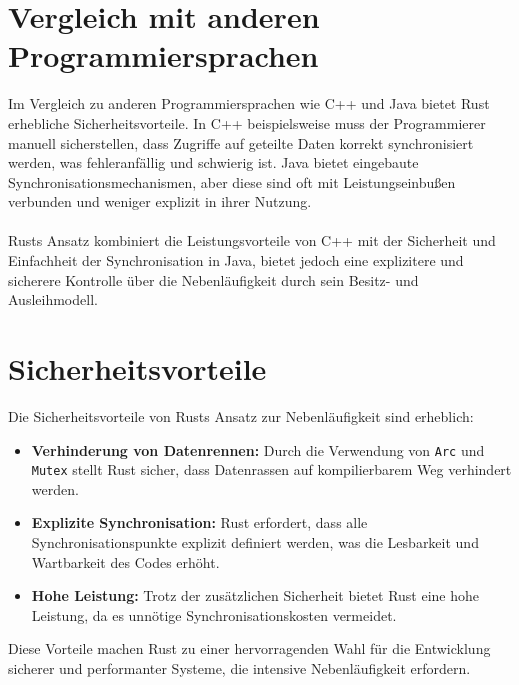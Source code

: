 \section{Vergleich mit anderen Programmiersprachen}

Im Vergleich zu anderen Programmiersprachen wie C++ und Java bietet Rust erhebliche Sicherheitsvorteile. 
In C++ beispielsweise muss der Programmierer manuell sicherstellen, dass Zugriffe auf geteilte Daten korrekt synchronisiert werden, was fehleranfällig und schwierig ist. 
Java bietet eingebaute Synchronisationsmechanismen, aber diese sind oft mit Leistungseinbußen verbunden und weniger explizit in ihrer Nutzung.\\
\\
Rusts Ansatz kombiniert die Leistungsvorteile von C++ mit der Sicherheit und Einfachheit der Synchronisation in Java, bietet jedoch eine explizitere und sicherere Kontrolle über die Nebenläufigkeit durch sein Besitz- und Ausleihmodell.

\section{Sicherheitsvorteile}

Die Sicherheitsvorteile von Rusts Ansatz zur Nebenläufigkeit sind erheblich:

\begin{itemize}
    \item \textbf{Verhinderung von Datenrennen:} Durch die Verwendung von \texttt{Arc} und \texttt{Mutex} stellt Rust sicher, dass Datenrassen auf kompilierbarem Weg verhindert werden.
    \item \textbf{Explizite Synchronisation:} Rust erfordert, dass alle Synchronisationspunkte explizit definiert werden, was die Lesbarkeit und Wartbarkeit des Codes erhöht.
    \item \textbf{Hohe Leistung:} Trotz der zusätzlichen Sicherheit bietet Rust eine hohe Leistung, da es unnötige Synchronisationskosten vermeidet.
\end{itemize}
\noindent
Diese Vorteile machen Rust zu einer hervorragenden Wahl für die Entwicklung sicherer und performanter Systeme, die intensive Nebenläufigkeit erfordern.

